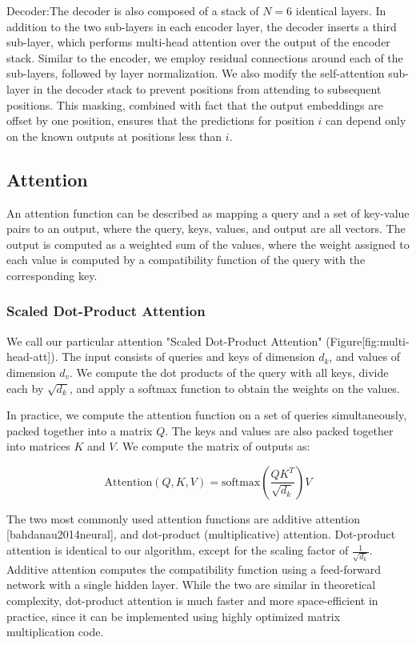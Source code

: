 \documentclass[11pt,a4paper]{article}
\begin{document}
Decoder:The decoder is also composed of a stack of $N=6$ identical layers.  In addition to the two sub-layers in each encoder layer, the decoder inserts a third sub-layer, which performs multi-head attention over the output of the encoder stack.  Similar to the encoder, we employ residual connections around each of the sub-layers, followed by layer normalization.  We also modify the self-attention sub-layer in the decoder stack to prevent positions from attending to subsequent positions.  This masking, combined with fact that the output embeddings are offset by one position, ensures that the predictions for position $i$ can depend only on the known outputs at positions less than $i$.

\subsection{Attention}

An attention function can be described as mapping a query and a set of key-value pairs to an output, where the query, keys, values, and output are all vectors.  The output is computed as a weighted sum of the values, where the weight assigned to each value is computed by a compatibility function of the query with the corresponding key.

\subsubsection{Scaled Dot-Product Attention}

We call our particular attention "Scaled Dot-Product Attention" (Figure[fig:multi-head-att]).   The input consists of queries and keys of dimension $d_k$, and values of dimension $d_v$.  We compute the dot products of the query with all keys, divide each by $\sqrt{d_k}$, and apply a softmax function to obtain the weights on the values.

In practice, we compute the attention function on a set of queries simultaneously, packed together into a matrix $Q$.   The keys and values are also packed together into matrices $K$ and $V$.  We compute the matrix of outputs as:

$$\begin{equation}
   \mathrm{Attention}(Q, K, V) = \mathrm{softmax}(\frac{QK^T}{\sqrt{d_k}})V
\end{equation}$$

The two most commonly used attention functions are additive attention [bahdanau2014neural], and dot-product (multiplicative) attention.  Dot-product attention is identical to our algorithm, except for the scaling factor of $\frac{1}{\sqrt{d_k}}$. Additive attention computes the compatibility function using a feed-forward network with a single hidden layer.  While the two are similar in theoretical complexity, dot-product attention is much faster and more space-efficient in practice, since it can be implemented using highly optimized matrix multiplication code.
\end{document}
